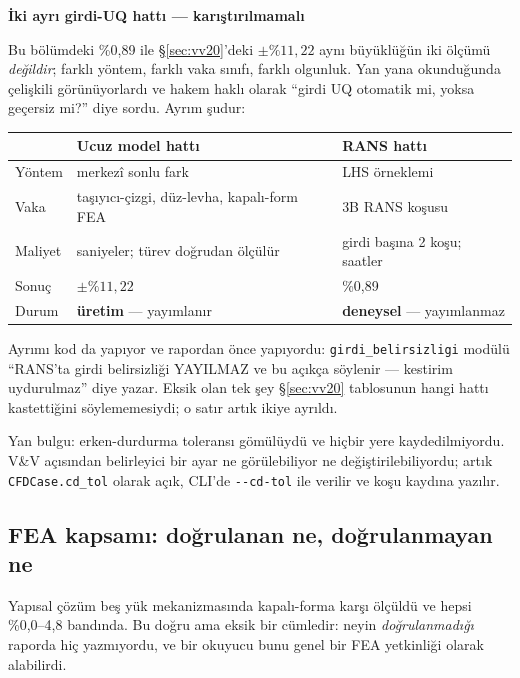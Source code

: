 \documentclass[11pt,a4paper]{article}
\newcommand{\kkkenar}{lacivert}
\newcommand{\kkzemin}{kod}
\newenvironment{renkkutu}[3]{%
  \renewcommand{\kkkenar}{#1}\renewcommand{\kkzemin}{#2}%
  \par\medskip\noindent
  \begin{lrbox}{\kutugovde}%
  \begin{minipage}{\dimexpr\linewidth-2\fboxsep-2\fboxrule\relax}\footnotesize
  \textcolor{#1}{\textbf{#3}}\par\vspace{3pt}%
}{%
  \end{minipage}%
  \end{lrbox}%
  \noindent\fcolorbox{\kkkenar}{\kkzemin}{\usebox{\kutugovde}}%
  \par\medskip
}
\newenvironment{dikkat}[1]{\begin{renkkutu}{orta}{ortabg}{#1}}{\end{renkkutu}}
\begin{document}
\begin{dikkat}{İki ayrı girdi-UQ hattı --- karıştırılmamalı}
Bu bölümdeki \%0{,}89 ile \S\ref{sec:vv20}'deki $\pm\%11{,}22$ aynı büyüklüğün
iki ölçümü \emph{değildir}; farklı yöntem, farklı vaka sınıfı, farklı
olgunluk. Yan yana okunduğunda çelişkili görünüyorlardı ve hakem haklı olarak
``girdi UQ otomatik mi, yoksa geçersiz mi?'' diye sordu. Ayrım şudur:

\begin{center}\footnotesize
\begin{tabular}{@{}lll@{}}
\toprule
 & \textbf{Ucuz model hattı} & \textbf{RANS hattı} \\
\midrule
Yöntem   & merkezî sonlu fark & LHS örneklemi \\
Vaka     & taşıyıcı-çizgi, düz-levha, kapalı-form FEA & 3B RANS koşusu \\
Maliyet  & saniyeler; türev doğrudan ölçülür & girdi başına 2 koşu; saatler \\
Sonuç    & $\pm\%11{,}22$ & \%0{,}89 \\
Durum    & \textbf{üretim} --- yayımlanır & \textbf{deneysel} --- yayımlanmaz \\
\bottomrule
\end{tabular}
\end{center}

\noindent Ayrımı kod da yapıyor ve rapordan önce yapıyordu:
\texttt{girdi\_belirsizligi} modülü ``RANS'ta girdi belirsizliği YAYILMAZ ve
bu açıkça söylenir --- kestirim uydurulmaz'' diye yazar. Eksik olan tek şey
\S\ref{sec:vv20} tablosunun hangi hattı kastettiğini söylememesiydi; o satır
artık ikiye ayrıldı.
\end{dikkat}

Yan bulgu: erken-durdurma toleransı gömülüydü ve hiçbir yere kaydedilmiyordu.
V\&V açısından belirleyici bir ayar ne görülebiliyor ne değiştirilebiliyordu;
artık \texttt{CFDCase.cd\_tol} olarak açık, CLI'de \texttt{-{}-cd-tol} ile
verilir ve koşu kaydına yazılır.

\subsection{FEA kapsamı: doğrulanan ne, doğrulanmayan ne}
\label{sub:fea-kapsam}

Yapısal çözüm beş yük mekanizmasında kapalı-forma karşı ölçüldü ve hepsi
\%0{,}0--4{,}8 bandında. Bu doğru ama eksik bir cümledir: neyin
\emph{doğrulanmadığı} raporda hiç yazmıyordu, ve bir okuyucu bunu genel bir
FEA yetkinliği olarak alabilirdi.
\end{document}
